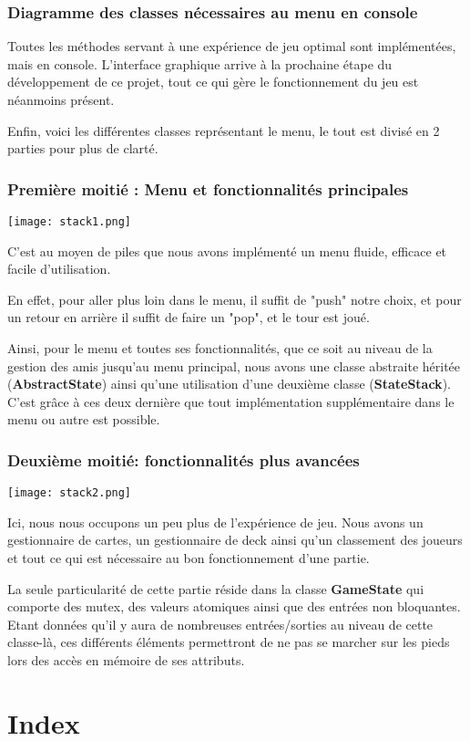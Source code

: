 \documentclass{article}
\begin{document}
		\newpage
		\subsubsection{Diagramme des classes nécessaires au menu en console}
			Toutes les méthodes servant à une expérience de jeu optimal sont implémentées, mais en console.
			L'interface graphique arrive à la prochaine étape du développement de ce projet, tout ce qui gère le fonctionnement du jeu est néanmoins présent.

			Enfin, voici les différentes classes représentant le menu, le tout est divisé en 2 parties pour plus de clarté.

			\subsubsection{Première moitié : Menu et fonctionnalités principales}
			\begin{center}\texttt{[image: stack1.png]}\end{center}
				C'est au moyen de piles que nous avons implémenté un menu fluide, efficace et facile d'utilisation.

				En effet, pour aller plus loin dans le menu, il suffit de "push" notre choix, et pour un retour en arrière il suffit de faire un "pop", et le tour est joué. 

				Ainsi, pour le menu et toutes ses fonctionnalités, que ce soit au niveau de la gestion des amis jusqu'au menu principal, 
				nous avons une classe abstraite héritée (\textbf{AbstractState}) ainsi qu'une utilisation d'une deuxième classe (\textbf{StateStack}). C'est grâce à ces deux dernière que tout 
				implémentation supplémentaire dans le menu ou autre est possible.

			\newpage
			\subsubsection{Deuxième moitié: fonctionnalités plus avancées}
			\begin{center}\texttt{[image: stack2.png]}\end{center}
				Ici, nous nous occupons un peu plus de l'expérience de jeu. Nous avons un gestionnaire de cartes, un gestionnaire de deck ainsi qu'un classement des joueurs et tout ce qui est nécessaire au bon fonctionnement d'une partie.

				La seule particularité de cette partie réside dans la classe \textbf{GameState} qui comporte des mutex, des valeurs atomiques ainsi que des entrées non bloquantes.
				Etant données qu'il y aura de nombreuses entrées/sorties au niveau de cette classe-là, ces différents éléments permettront de ne pas se marcher sur les pieds lors des accès en mémoire de ses attributs.
				
\newpage
\section{Index}
		\printglossary[type=glossary, style=Index, title=]
\end{document}

